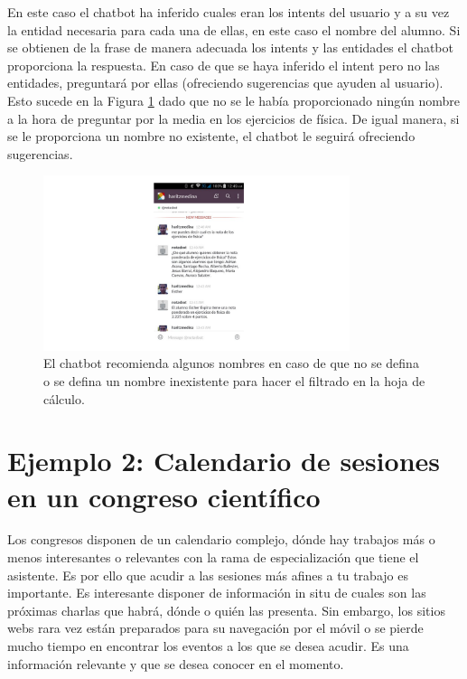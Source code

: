 En este caso el chatbot ha inferido cuales eran los intents del usuario y a su vez la entidad necesaria para cada una de ellas, en este caso el nombre del alumno. Si se obtienen de la frase de manera adecuada los intents y las entidades el chatbot proporciona la respuesta. En caso de que se haya inferido el intent pero no las entidades, preguntará por ellas (ofreciendo sugerencias que ayuden al usuario). Esto sucede en la Figura \ref{fig:EjecucionNotas2} dado que no se le había proporcionado ningún nombre a la hora de preguntar por la media en los ejercicios de física. De igual manera, si se le proporciona un nombre no existente, el chatbot le seguirá ofreciendo sugerencias.

\begin{figure}[htb]
	\centering
	\includegraphics[width=0.8\textwidth]{./figs/ejecucionNotas2.png}
	\caption{El chatbot recomienda algunos nombres en caso de que no se defina o se defina un nombre inexistente para hacer el filtrado en la hoja de cálculo.}
	\label{fig:EjecucionNotas2}
\end{figure}

\section{Ejemplo 2: Calendario de sesiones en un congreso científico}

Los congresos disponen de un calendario complejo, dónde hay trabajos más o menos interesantes o relevantes con la rama de especialización que tiene el asistente. Es por ello que acudir a las sesiones más afines a tu trabajo es importante. Es interesante disponer de información in situ de cuales son las próximas charlas que habrá, dónde o quién las presenta. Sin embargo, los sitios webs rara vez están preparados para su navegación por el móvil o se pierde mucho tiempo en encontrar los eventos a los que se desea acudir. Es una información relevante y que se desea conocer en el momento.

